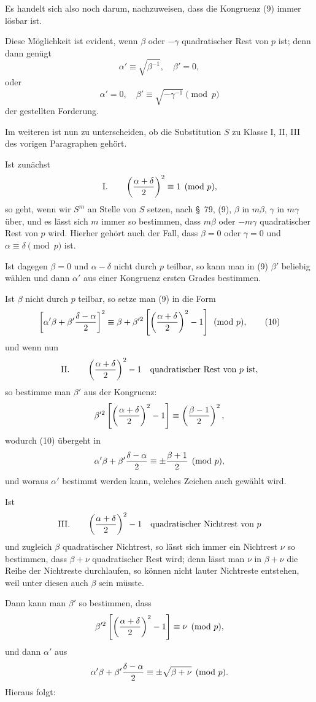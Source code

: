 \documentclass[11pt]{article}
\begin{document}
Es handelt sich also noch darum, nachzuweisen, dass die Kongruenz (9) immer lösbar ist.

Diese Möglichkeit ist evident, wenn $\beta$ oder $-\gamma$ quadratischer Rest von $p$ ist; denn dann genügt
\[
 \alpha'\equiv\sqrt{\beta^{-1}},\quad \beta'=0,
\]
oder
\[
 \alpha'=0,
 \quad \beta'\equiv\sqrt{-\gamma^{-1}}\pmod p
\]
der gestellten Forderung.

Im weiteren ist nun zu unterscheiden, ob die Substitution $S$ zu Klasse I, II, III des vorigen Paragraphen gehört.

Ist zunächst
\[
\text{I.}\qquad
 \left({\alpha+
\delta\over2}\right)^2\equiv1\pmod p,
\]
so geht, wenn wir $S^m$ an Stelle von $S$ setzen, nach \S~79, (9), $\beta$ in $m\beta$, $\gamma$ in $m\gamma$ über, und es lässt sich $m$ immer so bestimmen, dass $m\beta$ oder $-m\gamma$ quadratischer Rest von $p$ wird. Hierher gehört auch der Fall, dass $\beta=0$ oder $\gamma=0$ und $\alpha\equiv\delta\pmod p$ ist.

Ist dagegen $\beta=0$ und $\alpha-\delta$ nicht durch $p$ teilbar, so kann man in (9) $\beta'$ beliebig wählen und dann $\alpha'$ aus einer Kongruenz ersten Grades bestimmen.

Ist $\beta$ nicht durch $p$ teilbar, so setze man (9) in die Form
\begin{equation}
 \left[\alpha'\beta+\beta'{\delta-\alpha\over2}\right]^2
 \equiv
 \beta+\beta'^2\left[\left({\alpha+
\delta\over2}\right)^2-1\right]
 \pmod p,
\tag{10}
\end{equation}
und wenn nun
\[
\text{II.}\qquad
 \left({\alpha+
\delta\over2}\right)^2-1
\quad\text{quadratischer Rest von }p\text{ ist},
\]
so bestimme man $\beta'$ aus der Kongruenz:
\[
 \beta'^2\left[\left({\alpha+
\delta\over2}\right)^2-1\right]
 \equiv \left({\beta-1\over2}\right)^2,
\]
wodurch (10) übergeht in
\[
 \alpha'\beta+
\beta'{\delta-\alpha\over2}\equiv
 \pm {\beta+1\over2}
 \pmod p,
\]
und woraus $\alpha'$ bestimmt werden kann, welches Zeichen auch gewählt wird.

Ist
\[
\text{III.}\qquad
 \left({\alpha+
\delta\over2}\right)^2-1
\quad\text{quadratischer Nichtrest von }p
\]
und zugleich $\beta$ quadratischer Nichtrest, so lässt sich immer ein Nichtrest $\nu$ so bestimmen, dass $\beta+
\nu$ quadratischer Rest wird; denn lässt man $\nu$ in $\beta+
\nu$ die Reihe der Nichtreste durchlaufen, so können nicht lauter Nichtreste entstehen, weil unter diesen auch $\beta$ sein müsste.

Dann kann man $\beta'$ so bestimmen, dass
\[
 \beta'^2\left[\left({\alpha+
\delta\over2}\right)^2-1\right]
 \equiv \nu\pmod p,
\]
und dann $\alpha'$ aus
\[
 \alpha'\beta+
\beta'{\delta-\alpha\over2}
 \equiv \pm\sqrt{\beta+
\nu}\pmod p.
\]
Hieraus folgt:
\end{document}

